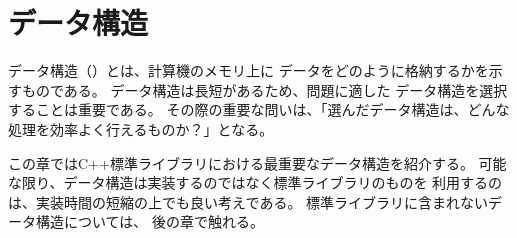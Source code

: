 \begin{comment}
\chapter{Data structures}

\index{data structure}

A \key{data structure} is a way to store
data in the memory of a computer.
It is important to choose an appropriate
data structure for a problem,
because each data structure has its own
advantages and disadvantages.
The crucial question is: which operations
are efficient in the chosen data structure?

This chapter introduces the most important
data structures in the C++ standard library.
It is a good idea to use the standard library
whenever possible,
because it will save a lot of time.
Later in the book we will learn about more sophisticated
data structures that are not available
in the standard library.

\end{comment}

\chapter{データ構造}


データ構造（）とは、計算機のメモリ上に
データをどのように格納するかを示すものである。
データ構造は長短があるため、問題に適した
データ構造を選択することは重要である。
その際の重要な問いは、「選んだデータ構造は、どんな処理を効率よく行えるものか？」となる。

この章ではC++標準ライブラリにおける最重要なデータ構造を紹介する。
可能な限り、データ構造は実装するのではなく標準ライブラリのものを
利用するのは、実装時間の短縮の上でも良い考えである。
標準ライブラリに含まれないデータ構造については、
後の章で触れる。

\begin{comment}
\section{Dynamic arrays}

\index{dynamic array}
\index{vector}

A \key{dynamic array} is an array whose
size can be changed during the execution
of the program.
The most popular dynamic array in C++ is
the \texttt{vector} structure,
which can be used almost like an ordinary array.

The following code creates an empty vector and
adds three elements to it:
\end{comment}

